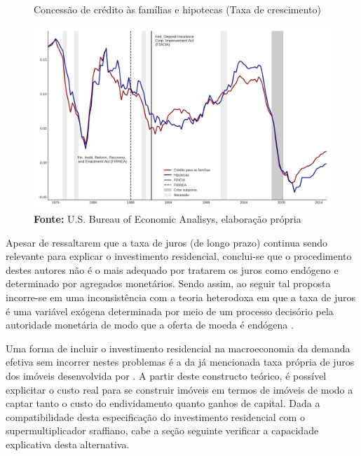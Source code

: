 \begin{figure}[htb]
	\centering
	\caption{Concessão de crédito às famílias e hipotecas (Taxa de crescimento)}
	\label{FigCreditoFDICIA}
	\includegraphics[width=\textwidth]{../../Dados/Fatos_Estilizados/figs/FDICIA.png}
	\caption*{\textbf{Fonte:} U.S. Bureau of Economic Analisys, elaboração própria}
\end{figure}
	
Apesar de \textcite{gauger_residential_2003} ressaltarem que a taxa de juros (de longo prazo) continua sendo relevante para explicar o investimento residencial, conclui-se que o procedimento destes autores não é o mais adequado por tratarem os juros como endógeno e determinado por agregados monetários. Sendo assim, ao seguir tal proposta incorre-se em uma inconsistência com a teoria heterodoxa em que a taxa de juros é uma variável exógena determinada por meio de um processo decisório pela autoridade monetária de modo que a oferta de moeda é endógena \cite[p.~230--256]{lavoie_post-keynesian_2015}.

Uma forma de incluir o investimento residencial na macroeconomia da demanda efetiva sem incorrer nestes problemas é a da já mencionada taxa própria de juros dos imóveis desenvolvida por \textcite{teixeira_crescimento_2015}. A partir deste constructo teórico, é possível explicitar o custo real para se construir imóveis em termos de imóveis de modo a captar tanto o custo do endividamento quanto ganhos de capital.
Dada a compatibilidade desta especificação do investimento residencial com o supermultiplicador sraffiano, cabe a seção seguinte verificar a capacidade explicativa desta alternativa.


